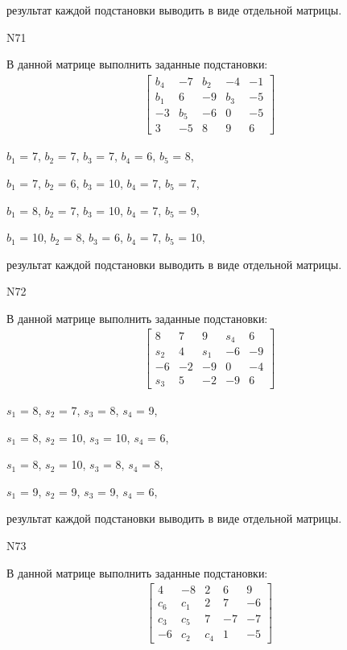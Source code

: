 \documentclass[11pt]{report}
\begin{document}
результат каждой подстановки выводить в виде отдельной матрицы.

N71

В данной матрице выполнить заданные подстановки:
\begin{align*}
\left[\begin{matrix}b_{4} & -7 & b_{2} & -4 & -1\\b_{1} & 6 & -9 & b_{3} & -5\\-3 & b_{5} & -6 & 0 & -5\\3 & -5 & 8 & 9 & 6\end{matrix}\right]
\end{align*}


$b_{1}$ = 7, $b_{2}$ = 7, $b_{3}$ = 7, $b_{4}$ = 6, $b_{5}$ = 8, 

$b_{1}$ = 7, $b_{2}$ = 6, $b_{3}$ = 10, $b_{4}$ = 7, $b_{5}$ = 7, 

$b_{1}$ = 8, $b_{2}$ = 7, $b_{3}$ = 10, $b_{4}$ = 7, $b_{5}$ = 9, 

$b_{1}$ = 10, $b_{2}$ = 8, $b_{3}$ = 6, $b_{4}$ = 7, $b_{5}$ = 10, 

результат каждой подстановки выводить в виде отдельной матрицы.

N72

В данной матрице выполнить заданные подстановки:
\begin{align*}
\left[\begin{matrix}8 & 7 & 9 & s_{4} & 6\\s_{2} & 4 & s_{1} & -6 & -9\\-6 & -2 & -9 & 0 & -4\\s_{3} & 5 & -2 & -9 & 6\end{matrix}\right]
\end{align*}


$s_{1}$ = 8, $s_{2}$ = 7, $s_{3}$ = 8, $s_{4}$ = 9, 

$s_{1}$ = 8, $s_{2}$ = 10, $s_{3}$ = 10, $s_{4}$ = 6, 

$s_{1}$ = 8, $s_{2}$ = 10, $s_{3}$ = 8, $s_{4}$ = 8, 

$s_{1}$ = 9, $s_{2}$ = 9, $s_{3}$ = 9, $s_{4}$ = 6, 

результат каждой подстановки выводить в виде отдельной матрицы.

N73

В данной матрице выполнить заданные подстановки:
\begin{align*}
\left[\begin{matrix}4 & -8 & 2 & 6 & 9\\c_{6} & c_{1} & 2 & 7 & -6\\c_{3} & c_{5} & 7 & -7 & -7\\-6 & c_{2} & c_{4} & 1 & -5\end{matrix}\right]
\end{align*}
\end{document}
